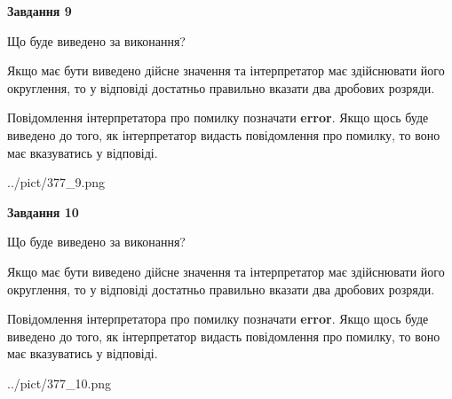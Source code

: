 \documentclass[12pt, ukrainian]{article}
\begin{document}
{\begin {Large}
{\begin {center}\textbf{Завдання 9}\end {center}}\par
Що буде виведено за виконання? \par

Якщо має бути виведено дійсне значення та інтерпретатор має здійснювати його округлення, 
то у відповіді достатньо правильно вказати два дробових розряди.

Повідомлення інтерпретатора про помилку позначати \textbf{error}.
Якщо щось буде виведено до того, як інтерпретатор видасть повідомлення про помилку, 
то воно має вказуватись у відповіді. \par

\begin{center}
	{../pict/377_9.png}
\end{center}
\newpage

{\begin {center}\textbf{Завдання 10}\end {center}}\par
Що буде виведено за виконання? \par

Якщо має бути виведено дійсне значення та інтерпретатор має здійснювати його округлення, 
то у відповіді достатньо правильно вказати два дробових розряди.

Повідомлення інтерпретатора про помилку позначати \textbf{error}.
Якщо щось буде виведено до того, як інтерпретатор видасть повідомлення про помилку, 
то воно має вказуватись у відповіді. \par

\begin{center}
	{../pict/377_10.png}
\end{center}
\newpage

\end {Large}}
\end{document}
